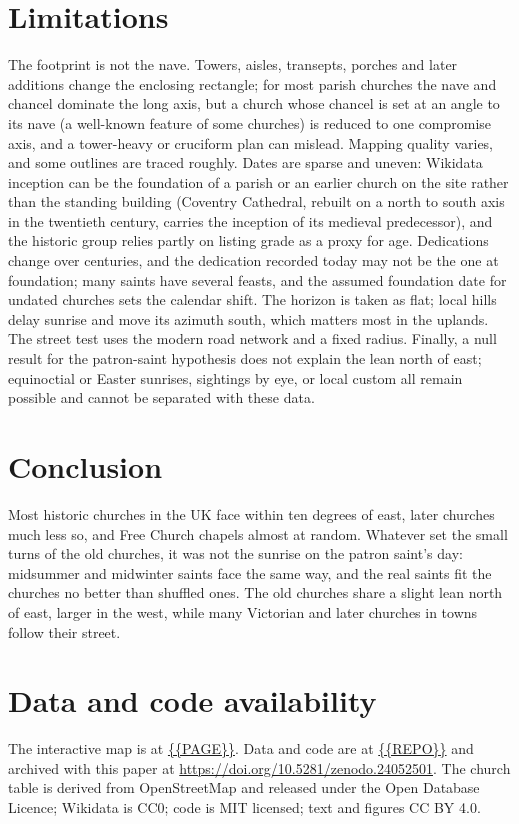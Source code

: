 \documentclass[11pt,a4paper]{article}
\begin{document}
\section{Limitations}
The footprint is not the nave. Towers, aisles, transepts, porches and later additions change the enclosing rectangle; for most parish churches the nave and chancel dominate the long axis, but a church whose chancel is set at an angle to its nave (a well-known feature of some churches) is reduced to one compromise axis, and a tower-heavy or cruciform plan can mislead. Mapping quality varies, and some outlines are traced roughly. Dates are sparse and uneven: Wikidata inception can be the foundation of a parish or an earlier church on the site rather than the standing building (Coventry Cathedral, rebuilt on a north to south axis in the twentieth century, carries the inception of its medieval predecessor), and the historic group relies partly on listing grade as a proxy for age. Dedications change over centuries, and the dedication recorded today may not be the one at foundation; many saints have several feasts, and the assumed foundation date for undated churches sets the calendar shift. The horizon is taken as flat; local hills delay sunrise and move its azimuth south, which matters most in the uplands. The street test uses the modern road network and a fixed radius. Finally, a null result for the patron-saint hypothesis does not explain the lean north of east; equinoctial or Easter sunrises, sightings by eye, or local custom all remain possible and cannot be separated with these data.

\section{Conclusion}
Most historic churches in the UK face within ten degrees of east, later churches much less so, and Free Church chapels almost at random. Whatever set the small turns of the old churches, it was not the sunrise on the patron saint's day: midsummer and midwinter saints face the same way, and the real saints fit the churches no better than shuffled ones. The old churches share a slight lean north of east, larger in the west, while many Victorian and later churches in towns follow their street.

\section*{Data and code availability}
The interactive map is at \url{{{PAGE}}}. Data and code are at \url{{{REPO}}} and archived with this paper at \url{https://doi.org/10.5281/zenodo.24052501}. The church table is derived from OpenStreetMap and released under the Open Database Licence; Wikidata is CC0; code is MIT licensed; text and figures CC BY 4.0.
\end{document}
